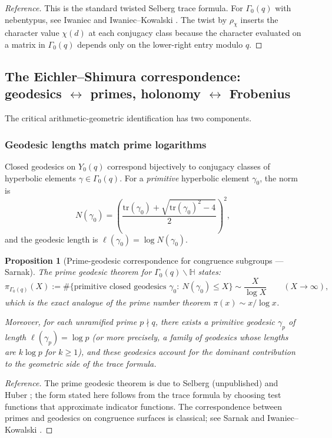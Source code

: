 \documentclass[11pt,oneside]{amsbook}
\numberwithin{equation}{section}
\theoremstyle{plain}
\newtheorem{proposition}[theorem]{Proposition}
\theoremstyle{definition}
\theoremstyle{remark}
\newcommand{\HH}{\mathbb{H}}
\begin{document}
\begin{proof}[Reference]
This is the standard twisted Selberg trace formula.
For $\Gamma_0(q)$ with nebentypus, see Iwaniec \cite[Ch.~11]{IwaniecSpectralMethods} and Iwaniec--Kowalski \cite[Ch.~12]{IwaniecKowalski2004AnalyticNT}.
The twist by $\rho_\chi$ inserts the character value $\chi(d)$ at each conjugacy class because the character evaluated on a matrix in $\Gamma_0(q)$ depends only on the lower-right entry modulo $q$.
\end{proof}

\subsection{The Eichler--Shimura correspondence: geodesics $\leftrightarrow$ primes, holonomy $\leftrightarrow$ Frobenius}
\label{sec:eichler_shimura_matching}

The critical arithmetic-geometric identification has two components.

\subsubsection{Geodesic lengths match prime logarithms}

Closed geodesics on $Y_0(q)$ correspond bijectively to conjugacy classes of hyperbolic elements $\gamma\in\Gamma_0(q)$.
For a \emph{primitive} hyperbolic element $\gamma_0$, the norm is
\[
N(\gamma_0)=\left(\frac{\mathrm{tr}(\gamma_0)+\sqrt{\mathrm{tr}(\gamma_0)^2-4}}{2}\right)^2,
\]
and the geodesic length is $\ell(\gamma_0)=\log N(\gamma_0)$.

\begin{proposition}[Prime-geodesic correspondence for congruence subgroups --- Sarnak]
\label{prop:prime_geodesic_correspondence}
The prime geodesic theorem for $\Gamma_0(q)\backslash\HH$ states:
\[
\pi_{\Gamma_0(q)}(X):=\#\{\text{primitive closed geodesics }\gamma_0:\ N(\gamma_0)\le X\}
\sim \frac{X}{\log X}\qquad(X\to\infty),
\]
which is the exact analogue of the prime number theorem $\pi(x)\sim x/\log x$.

Moreover, for each unramified prime $p\nmid q$, there exists a primitive geodesic $\gamma_p$ of length $\ell(\gamma_p)=\log p$ (or more precisely, a family of geodesics whose lengths are $k\log p$ for $k\ge 1$), and these geodesics account for the dominant contribution to the geometric side of the trace formula.
\end{proposition}

\begin{proof}[Reference]
The prime geodesic theorem is due to Selberg (unpublished) and Huber \cite{Huber1961PGT}; the form stated here follows from the trace formula by choosing test functions that approximate indicator functions.
The correspondence between primes and geodesics on congruence surfaces is classical; see Sarnak \cite{Sarnak1990PGT} and Iwaniec--Kowalski \cite[Ch.~12]{IwaniecKowalski2004AnalyticNT}.
\end{proof}
\end{document}
